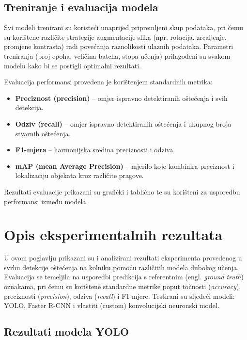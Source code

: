 \documentclass[conference]{IEEEtran}
\begin{document}
\subsection{Treniranje i evaluacija modela}
\label{sub:treniranje_evaluacija}

Svi modeli trenirani su koristeći unaprijed pripremljeni skup podataka, pri čemu su korištene različite strategije augmentacije slika (npr. rotacija, zrcaljenje, promjene kontrasta) radi povećanja raznolikosti ulaznih podataka. Parametri treniranja (broj epoha, veličina batcha, stopa učenja) prilagođeni su svakom modelu kako bi se postigli optimalni rezultati.

Evaluacija performansi provedena je korištenjem standardnih metrika:

\begin{itemize}
    \item \textbf{Preciznost (precision)} – omjer ispravno detektiranih oštećenja i svih detekcija.
    \item \textbf{Odziv (recall)} – omjer ispravno detektiranih oštećenja i ukupnog broja stvarnih oštećenja.
    \item \textbf{F1-mjera} – harmonijska sredina preciznosti i odziva.
    \item \textbf{mAP (mean Average Precision)} – mjerilo koje kombinira preciznost i lokalizaciju objekata kroz različite pragove.
\end{itemize}

Rezultati evaluacije prikazani su grafički i tablično te su korišteni za usporedbu performansi između modela.


\section{Opis eksperimentalnih rezultata}

U ovom poglavlju prikazani su i analizirani rezultati eksperimenta provedenog u svrhu detekcije oštećenja na kolniku pomoću različitih modela dubokog učenja. Evaluacija se temeljila na usporedbi predikcija s referentnim (engl. \textit{ground truth}) oznakama, pri čemu su korištene standardne metrike poput točnosti (\textit{accuracy}), preciznosti (\textit{precision}), odziva (\textit{recall}) i F1-mjere. Testirani su sljedeći modeli: YOLO, Faster R-CNN i vlastiti (custom) konvolucijski neuronski model.

\subsection{Rezultati modela YOLO}
\end{document}

